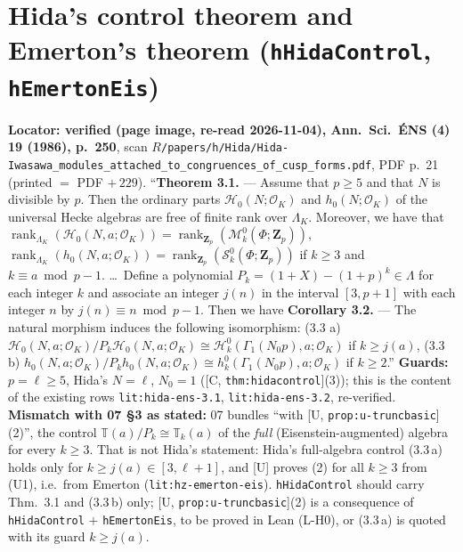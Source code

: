 \section{Hida's control theorem and Emerton's theorem (\texttt{hHidaControl}, \texttt{hEmertonEis})}

\begin{hypothesis}\label{lit:hz-hida-control}
  \leanok
  \textbf{Locator: verified (page image, re-read 2026-11-04), Ann.\ Sci.\ \'ENS (4) 19 (1986), p.~250}, scan
  $R$\texttt{/papers/h/Hida/Hida-Iwasawa\_modules\_attached\_to\_congruences\_of\_cusp\_forms.pdf}, PDF p.~21 (printed $=$ PDF $+\,229$).
  ``\textbf{Theorem 3.1.} --- Assume that $p\ge5$ and that $N$ is divisible by $p$. Then the ordinary parts $\mathcal H_0(N;\mathcal O_K)$ and
  $h_0(N;\mathcal O_K)$ of the universal Hecke algebras are free of finite rank over $\Lambda_K$. Moreover, we have that
  $\operatorname{rank}_{\Lambda_K}(\mathcal H_0(N,a;\mathcal O_K))=\operatorname{rank}_{\mathbf Z_p}(\mathcal M^0_k(\Phi;\mathbf Z_p))$,
  $\operatorname{rank}_{\Lambda_K}(h_0(N,a;\mathcal O_K))=\operatorname{rank}_{\mathbf Z_p}(\mathcal S^0_k(\Phi;\mathbf Z_p))$ if $k\ge3$ and $k\equiv a\bmod p-1$.
  \dots\ Define a polynomial $P_k=(1+X)-(1+p)^k\in\Lambda$ for each integer $k$ and associate an integer $j(n)$ in the interval $[3,p+1]$ with
  each integer $n$ by $j(n)\equiv n\bmod p-1$. Then we have \textbf{Corollary 3.2.} --- The natural morphism induces the following isomorphism:
  (3.3 a) $\mathcal H_0(N,a;\mathcal O_K)/P_k\mathcal H_0(N,a;\mathcal O_K)\cong\mathcal H^0_k(\Gamma_1(N_0p),a;\mathcal O_K)$ if $k\ge j(a)$,
  (3.3 b) $h_0(N,a;\mathcal O_K)/P_kh_0(N,a;\mathcal O_K)\cong h^0_k(\Gamma_1(N_0p),a;\mathcal O_K)$ if $k\ge2$.''
  \textbf{Guards:} $p=\ell\ge5$, Hida's $N=\ell$, $N_0=1$ ([C, \texttt{thm:hidacontrol}](3)); this is the content of the existing rows
  \texttt{lit:hida-ens-3.1}, \texttt{lit:hida-ens-3.2}, re-verified. \textbf{Mismatch with 07 \S3 as stated:} 07 bundles
  ``with [U, \texttt{prop:u-truncbasic}](2)'', the control $\mathbb T(a)/P_k\cong\mathbb T_k(a)$ of the \emph{full} (Eisenstein-augmented) algebra for every
  $k\ge3$. That is not Hida's statement: Hida's full-algebra control (3.3\,a) holds only for $k\ge j(a)\in[3,\ell+1]$, and [U] proves (2) for
  all $k\ge3$ from (U1), i.e.\ from Emerton (\texttt{lit:hz-emerton-eis}). \texttt{hHidaControl} should carry Thm.~3.1 and (3.3\,b) only;
  [U, \texttt{prop:u-truncbasic}](2) is a consequence of \texttt{hHidaControl} $+$ \texttt{hEmertonEis}, to be proved in Lean (L-H0), or
  (3.3\,a) is quoted with its guard $k\ge j(a)$.
\end{hypothesis}

